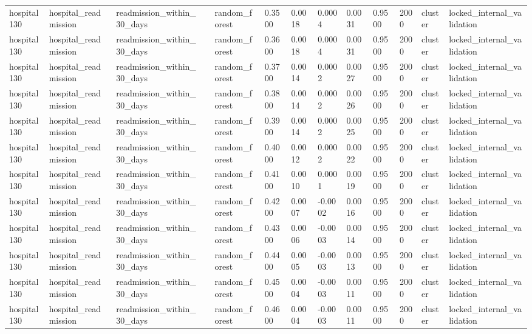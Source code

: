 \begin{tabular}{lllllllllllll}
hospital130 & hospital\_readmission & readmission\_within\_30\_days &  & random\_forest & 0.3500 & 0.0018 & 0.0004 & 0.0031 & 0.9500 & 2000 & cluster & locked\_internal\_validation \\
hospital130 & hospital\_readmission & readmission\_within\_30\_days &  & random\_forest & 0.3600 & 0.0018 & 0.0004 & 0.0031 & 0.9500 & 2000 & cluster & locked\_internal\_validation \\
hospital130 & hospital\_readmission & readmission\_within\_30\_days &  & random\_forest & 0.3700 & 0.0014 & 0.0002 & 0.0027 & 0.9500 & 2000 & cluster & locked\_internal\_validation \\
hospital130 & hospital\_readmission & readmission\_within\_30\_days &  & random\_forest & 0.3800 & 0.0014 & 0.0002 & 0.0026 & 0.9500 & 2000 & cluster & locked\_internal\_validation \\
hospital130 & hospital\_readmission & readmission\_within\_30\_days &  & random\_forest & 0.3900 & 0.0014 & 0.0002 & 0.0025 & 0.9500 & 2000 & cluster & locked\_internal\_validation \\
hospital130 & hospital\_readmission & readmission\_within\_30\_days &  & random\_forest & 0.4000 & 0.0012 & 0.0002 & 0.0022 & 0.9500 & 2000 & cluster & locked\_internal\_validation \\
hospital130 & hospital\_readmission & readmission\_within\_30\_days &  & random\_forest & 0.4100 & 0.0010 & 0.0001 & 0.0019 & 0.9500 & 2000 & cluster & locked\_internal\_validation \\
hospital130 & hospital\_readmission & readmission\_within\_30\_days &  & random\_forest & 0.4200 & 0.0007 & -0.0002 & 0.0016 & 0.9500 & 2000 & cluster & locked\_internal\_validation \\
hospital130 & hospital\_readmission & readmission\_within\_30\_days &  & random\_forest & 0.4300 & 0.0006 & -0.0003 & 0.0014 & 0.9500 & 2000 & cluster & locked\_internal\_validation \\
hospital130 & hospital\_readmission & readmission\_within\_30\_days &  & random\_forest & 0.4400 & 0.0005 & -0.0003 & 0.0013 & 0.9500 & 2000 & cluster & locked\_internal\_validation \\
hospital130 & hospital\_readmission & readmission\_within\_30\_days &  & random\_forest & 0.4500 & 0.0004 & -0.0003 & 0.0011 & 0.9500 & 2000 & cluster & locked\_internal\_validation \\
hospital130 & hospital\_readmission & readmission\_within\_30\_days &  & random\_forest & 0.4600 & 0.0004 & -0.0003 & 0.0011 & 0.9500 & 2000 & cluster & locked\_internal\_validation \\

\end{tabular}
